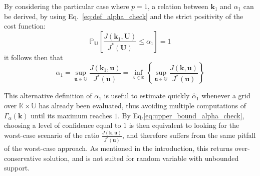 \documentclass[preprint, 1p]{elsarticle}
\newcommand{\Prob}{\mathbb{P}}
\newcommand{\checka}{{\alpha}}
\newcommand{\checkk}{\mathbf{k}}
\newcommand{\checkkp}{{\mathbf{k}}_p}
\newcommand{\Kspace}{\mathbb{K}}
\newcommand{\Uspace}{\mathbb{U}}
\begin{document}


By considering the particular case where $p=1$, a relation between $\checkk_1$ and $\checka_1$ can be derived, by using Eq.~\eqref{eq:def_alpha_check} and the strict positivity of the cost function:
\begin{equation}
  \label{eq:def_alpha1}
  \Prob_{\mathbf{U}}\left[\frac{J(\mathbf{k}_1,\mathbf{U})}{ J^*(\mathbf{U}) } \leq \checka_1\right]=1
\end{equation}
it follows then that 
\begin{equation}
  \label{eq:upper_bound_alpha_check}
  \checka_1 = \sup_{\mathbf{u}\in\Uspace} \frac{J(\mathbf{k}_1,\mathbf{u})}{J^*(\mathbf{u})} =  \inf_{\mathbf{k}\in\Kspace} \left\{ \sup_{\mathbf{u}\in\Uspace} \frac{J(\mathbf{k},\mathbf{u})}{J^*(\mathbf{u})} \right\} 
\end{equation}

This alternative definition of $\checka_1$ is useful to estimate quickly $\hat{\checka}_1$ whenever a grid over $\mathbb{K}\times\mathbb{U}$ has already been evaluated, thus avoiding multiple computations of $\Gamma_{\alpha}(\mathbf{k})$ until its maximum reaches $1$. By Eq.\eqref{eq:upper_bound_alpha_check}, choosing a level of confidence equal to $1$ is then equivalent to looking for the worst-case scenario of the ratio $\frac{J(\mathbf{k},\mathbf{u})}{J^*(\mathbf{u})}$, and therefore suffers from the same pitfall of the worst-case approach. As mentioned in the introduction, this returns over-conservative solution, and is not suited for random variable with unbounded support.
\end{document}
